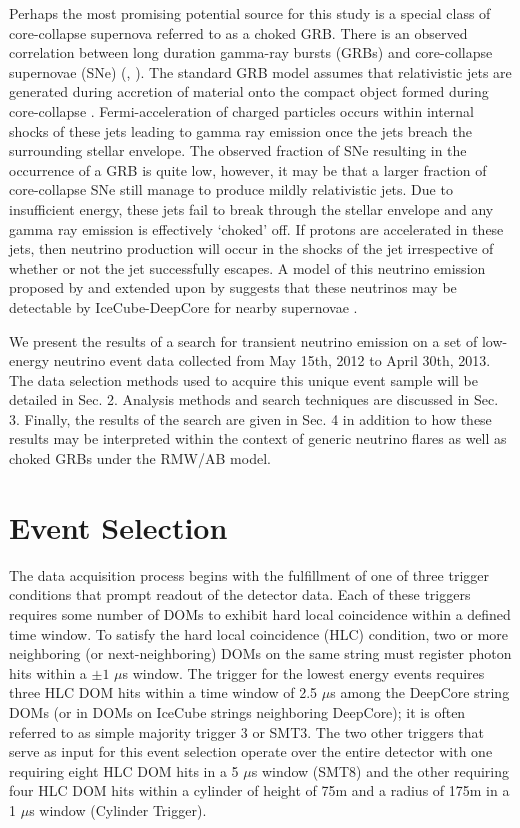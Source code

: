 \documentclass[manuscript]{aastex}
\begin{document}
Perhaps the most promising potential source for this study is a special class of core-collapse supernova referred to as a choked GRB. There is an observed correlation between long duration gamma-ray bursts (GRBs) and core-collapse supernovae (SNe) (\citep{2006ARA&A..44..507W}, \citep{2011AN....332..434M}).  The standard GRB model assumes that relativistic jets are generated during accretion of material onto the compact object formed during core-collapse \citep{1992MNRAS.258P..41R}. Fermi-acceleration of charged particles occurs within internal shocks of these jets leading to gamma ray emission once the jets breach the surrounding stellar envelope.  The observed fraction of SNe resulting in the occurrence of a GRB is quite low, however, it may be that a larger fraction of core-collapse SNe still manage to produce mildly relativistic jets.  Due to insufficient energy, these jets fail to break through the stellar envelope and any gamma ray emission is effectively `choked' off. If protons are accelerated in these jets, then neutrino production will occur in the shocks of the jet irrespective of whether or not the jet successfully escapes. A model of this neutrino emission proposed by \cite{2004PhRvL..93r1101R} and extended upon by \cite{2005PhRvL..95f1103A} suggests that these neutrinos may be detectable by IceCube-DeepCore for nearby supernovae \citep{PhysRevD.81.083011}.

We present the results of a search for transient neutrino emission on a set of low-energy neutrino event data collected from May 15th, 2012 to April 30th, 2013. The data selection methods used to acquire this unique event sample will be detailed in Sec. 2. Analysis methods and search techniques are discussed in Sec. 3. Finally, the results of the search are given in Sec. 4 in addition to how these results may be interpreted within the context of generic neutrino flares as well as choked GRBs under the RMW/AB model.
\section{Event Selection}

The data acquisition process begins with the fulfillment of one of three trigger conditions that prompt readout of the detector data. Each of these triggers requires some number of DOMs to exhibit hard local coincidence within a defined time window. To satisfy the hard local coincidence (HLC) condition, two or more neighboring (or next-neighboring) DOMs on the same string must register photon hits within a $\pm1$ $\mu$s window. The trigger for the lowest energy events requires three HLC DOM hits within a time window of 2.5 $\mu$s among the DeepCore string DOMs (or in DOMs on IceCube strings neighboring DeepCore); it is often referred to as simple majority trigger 3 or SMT3. The two other triggers that serve as input for this event selection operate over the entire detector with one requiring eight HLC DOM hits in a 5 $\mu$s window (SMT8) and the other requiring four HLC DOM hits within a cylinder of height of 75m and a radius of 175m in a 1 $\mu$s window (Cylinder Trigger).
\end{document}
